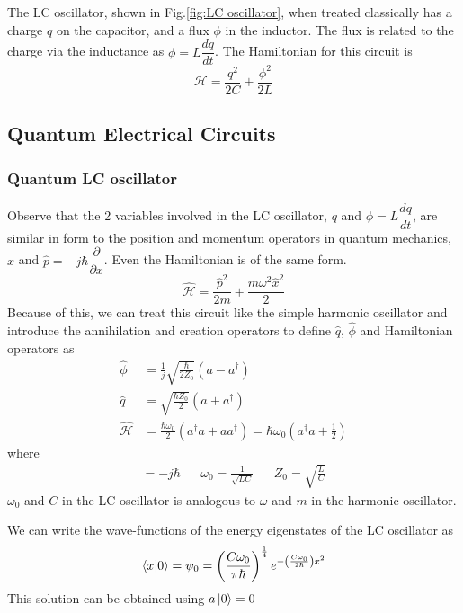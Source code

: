 The LC oscillator, shown in Fig.\ref{fig:LC oscillator}, when treated classically has a charge $q$ on the capacitor, and a flux $\phi$ in the inductor. The flux is related to the charge via the inductance as $\phi=L\dfrac{dq}{dt}$. The Hamiltonian for this circuit is
\begin{equation}
\mathcal{H}=\frac{q^2}{2C}+\frac{\phi^2}{2L}
\end{equation}

\subsection{Quantum Electrical Circuits}

\subsubsection{Quantum LC oscillator}

Observe that the 2 variables involved in the LC oscillator, $q$ and $\phi=L\dfrac{dq}{dt}$, are similar in form to the position and momentum operators in quantum mechanics, $\hat{x}$ and $\hat{p}=-j\hbar\dfrac{\partial}{\partial x}$. Even the Hamiltonian is of the same form.\parencite{Devoret1995}
\begin{equation}
\hat{\mathcal{H}}=\frac{\hat{p}^2}{2m}+\frac{m\omega^2\hat{x}^2}{2}
\end{equation}
Because of this, we can treat this circuit like the simple harmonic oscillator and introduce the annihilation and creation operators to define $\hat{q}$, $\hat{\phi}$ and Hamiltonian operators as
\begin{subequations}
\begin{align}
\hat{\phi}&=\frac{1}{j}\sqrt{\frac{\hbar}{2Z_0}}(a-a^\dag)\\
\hat{q}&=\sqrt{\frac{\hbar Z_0}{2}}(a+a^\dag)\\
\hat{\mathcal{H}}&=\frac{\hbar\omega_0}{2}(a^\dag a+aa^\dag)=\hbar\omega_0\left(a^\dag a + \frac{1}{2}\right)
\label{eqn:harmonic hamiltonian}
\end{align}
\end{subequations}
where
\begin{align*}
[\hat{\phi},\hat{q}]=-j\hbar&&
\omega_0=\frac{1}{\sqrt{LC}}&&
Z_0=\sqrt{\frac{L}{C}}
\end{align*}
$\omega_0$ and $C$ in the LC oscillator is analogous to $\omega$ and $m$ in the harmonic oscillator.

We can write the wave-functions of the energy eigenstates of the LC oscillator as
\begin{equation}
\bra{x}\ket{0}=\psi_0=\left(\frac{C\omega_0}{\pi\hbar}\right)^\frac{1}{4}e^{-\left(\frac{C\omega_0}{2\hbar}\right)x^2}
\end{equation}
This solution can be obtained using $a\ket{0}=0$

